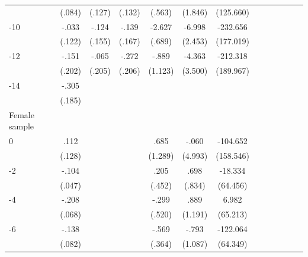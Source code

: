 \begin{table}[h]
\begin{adjustbox}{max width=\linewidth}
\begin{threeparttable}
{\begin{tabular}{l*{6}{S
S}}
                &   (.084)         &   (.127)         &   (.132)         &   (.563)         &  (1.846)         &(125.660)         \\
-10            &    -.033         &    -.124         &    -.139         &   -2.627\sym{***}&   -6.998\sym{***}& -232.656         \\
                &   (.122)         &   (.155)         &   (.167)         &   (.689)         &  (2.453)         &(177.019)         \\
-12           &    -.151         &    -.065         &    -.272         &    -.889         &   -4.363         & -212.318         \\
                &   (.202)         &   (.205)         &   (.206)         &  (1.123)         &  (3.500)         &(189.967)         \\
-14           &    -.305\sym{*}  &                  &                  &                  &                  &                  \\
                &   (.185)         &                  &                  &                  &                  &                  \\
\midrule
Female sample &&&&&&\\
0               &     .112         &         &         &     .685         &    -.060         & -104.652         \\
                &   (.128)         &         &         &  (1.289)         &  (4.993)         &(158.546)         \\
-2             &    -.104\sym{**} &         &         &     .205         &     .698         &  -18.334         \\
                &   (.047)         &         &         &   (.452)         &   (.834)         & (64.456)         \\
-4             &    -.208\sym{***}&         &         &    -.299         &     .889         &    6.982         \\
                &   (.068)         &         &         &   (.520)         &  (1.191)         & (65.213)         \\
-6             &    -.138\sym{*}  &         &         &    -.569         &    -.793         & -122.064\sym{*}  \\
                &   (.082)         &         &         &   (.364)         &  (1.087)         & (64.349)         \\

\end{tabular}}
\end{threeparttable}
\end{adjustbox}
\end{table}
